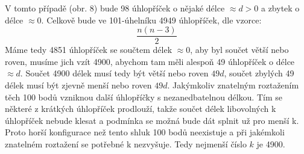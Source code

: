 \documentclass[12pt]{article}
\begin{document}
\begin{enumerate}
    V tomto případě (obr. 8) bude 98 úhlopříček o nějaké délce $\approx d>0$ a zbytek o délce $\approx 0$.
    Celkově bude ve 101-úhelníku 4949 úhlopříček, dle vzorce:
    \[
    \frac{n(n-3)}{2}
    \]
    Máme tedy 4851 úhlopříček se součtem délek $\approx 0$, aby byl součet větší nebo roven, musíme jich vzít
    4900, abychom tam měli alespoň 49 úhlopříček o délce $\approx d$. Součet 4900 délek musí tedy být větší nebo roven $49d$,
    součet zbylých 49 délek musí být zjevně menší nebo roven $49d$.
    Jakýmkoliv znatelným roztažením těch 100 bodů vzniknou další úhlopříčky s nezanedbatelnou délkou.
    Tím se některé z krátkých úhlopříček prodlouží, takže součet délek libovolných k úhlopříček nebude klesat
    a podmínka se možná bude dát splnit už pro menší k. Proto horší konfigurace než tento shluk 100 bodů neexistuje
    a při jakémkoli znatelném roztažení se potřebné k nezvyšuje.
    Tedy nejmenší číslo $k$ je 4900.

\end{enumerate}
\end{document}
